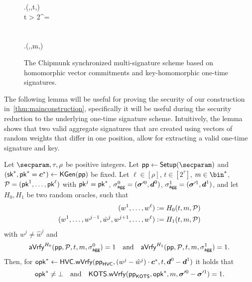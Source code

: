 \begin{figure}[p]
\begin{pchstack}
\begin{pcvstack}
{    \opk \gets \hvc.\sverify(\hvcparams,,t,)\\
    \pcif t > 2^\tau \pcor \opk = \bot\\
    \quad {}\\
    \pcelse\\
    \quad \pcreturn \hots.\sverify(\hotsparams,\opk,m,\otsig)
  }
  \pcvspace
\end{pcvstack}
\end{pchstack}
\caption{The Chipmunk synchronized multi-signature scheme based on homomorphic vector commitments and key-homomorphic one-time signatures.}
\label{fig:nidvconst}
\end{figure}
%
\iffalse
The following lemma will be useful for proving the security of our construction in~\autoref{thm:mainconstruction}, specifically it will be useful during the security reduction to the underlying one-time signature scheme.
Intuitively, the lemma shows that two valid aggregate signatures that are created using vectors of random weights that differ in one position, allow for extracting a valid one-time signature and key.

\begin{lemma}\label{lem:forkingisuseful}
  Let $\secparam,\tau,\rho$ be positive integers.
  Let $\params\gets\setup(\secparam)$ and $(\mathsf{sk}^*,\mathsf{pk}^*=\boldsymbol{c}^*) \gets\mathsf{KGen}(\mathsf{pp})$ be fixed.
  Let $\ell\in[\rho]$, $t\in[2^\tau]$, $m\in\bin^*$, $\mathcal{P} = (\mathsf{pk}^1,\dots,\mathsf{pk}^{\ell})$ with $\mathsf{pk}^j=\mathsf{pk}^*$, $\sigma_\mathsf{agg}^0=(\boldsymbol{\sigma}'^0,\boldsymbol{d}^0)$, $\sigma_\mathsf{agg}^1=(\boldsymbol{\sigma}'^1,\boldsymbol{d}^1)$, and let $H_0,H_1$ be two random oracles, such that 
  \begin{align*}
    (w^1,\dots,w^{\ell}) &:= H_0(t,m,\mathcal{P})\\
    (w^1,\dots,w^{j-1},\hat{w}^j,w^{j+1},\dots,w^{\ell}) &:= H_1(t,m,\mathcal{P})
  \end{align*}
  with $w^j\neq \hat{w}^j$ and
  \[
    \mathsf{aVrfy}^{H_0}(\mathsf{pp},\mathcal{P},t,m,\sigma_\mathsf{agg}^0)=1 \quad \text{and} \quad \mathsf{aVrfy}^{H_1}(\mathsf{pp},\mathcal{P},t,m,\sigma_\mathsf{agg}^1)=1.
  \]
  Then, for $\mathsf{opk}^*\gets\mathsf{HVC}.\mathsf{wVrfy}(\mathsf{pp}_{\mathsf{HVC}},(w^j-\hat{w}^j)\cdot \boldsymbol{c}^*,t,\boldsymbol{d}^0-\boldsymbol{d}^1)$ it holds that
  \[
    \mathsf{opk}^* \neq \bot \quad \text{and} \quad \mathsf{KOTS}.\mathsf{wVrfy}(\mathsf{pp}_{\mathsf{KOTS}},\mathsf{opk}^*,m,\boldsymbol{\sigma}'^0-\boldsymbol{\sigma}'^1) = 1.
  \]
\end{lemma}

